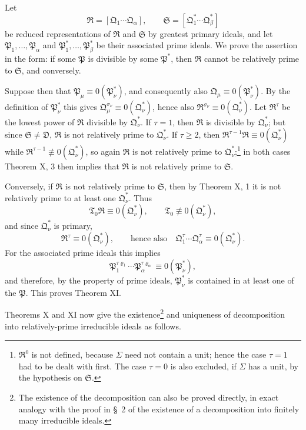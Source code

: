 \documentclass[11pt]{article}
\providecommand{\ideal}[1]{\mathfrak{#1}}
\begin{document}
Let
\[
 \ideal R=[\ideal Q_1\cdots\ideal Q_\alpha],
 \qquad
 \ideal S=[\ideal Q_1^*\cdots\ideal Q_\beta^*]
\]
be reduced representations of $\ideal R$ and $\ideal S$ by greatest primary ideals, and let $\ideal P_1,
\ldots,\ideal P_\alpha$ and $\ideal P_1^*,
\ldots,\ideal P_\beta^*$ be their associated prime ideals. We prove the assertion in the form: if some $\ideal P$ is divisible by some $\ideal P^*$, then $\ideal R$ cannot be relatively prime to $\ideal S$, and conversely.

Suppose then that $\ideal P_\mu\equiv0(\ideal P_\nu^*)$, and consequently also $\ideal Q_\mu\equiv0(\ideal P_\nu^*)$. By the definition of $\ideal P_\nu^*$ this gives $\ideal Q_\mu^{\sigma_\nu}\equiv0(\ideal Q_\nu^*)$, hence also $\ideal R^{\sigma_\nu}\equiv0(\ideal Q_\nu^*)$. Let $\ideal R^\tau$ be the lowest power of $\ideal R$ divisible by $\ideal Q_\nu^*$. If $\tau=1$, then $\ideal R$ is divisible by $\ideal Q_\nu^*$; but since $\ideal S\ne\ideal D$, $\ideal R$ is not relatively prime to $\ideal Q_\nu^*$. If $\tau\ge2$, then $\ideal R^{\tau-1}\ideal R\equiv0(\ideal Q_\nu^*)$ while $\ideal R^{\tau-1}\not\equiv0(\ideal Q_\nu^*)$, so again $\ideal R$ is not relatively prime to $\ideal Q_\nu^*$;\footnote{$\ideal R^0$ is not defined, because $\Sigma$ need not contain a unit; hence the case $\tau=1$ had to be dealt with first. The case $\tau=0$ is also excluded, if $\Sigma$ has a unit, by the hypothesis on $\ideal S$.} in both cases Theorem X, 3 then implies that $\ideal R$ is not relatively prime to $\ideal S$.

Conversely, if $\ideal R$ is not relatively prime to $\ideal S$, then by Theorem X, 1 it is not relatively prime to at least one $\ideal Q_\nu^*$. Thus
\[
 \ideal T_0\ideal R\equiv0(\ideal Q_\nu^*),
 \qquad
 \ideal T_0\not\equiv0(\ideal Q_\nu^*),
\]
and since $\ideal Q_\nu^*$ is primary,
\[
 \ideal R^\tau\equiv0(\ideal Q_\nu^*),\qquad
 \text{hence also}\quad
 \ideal Q_1^\tau\cdots\ideal Q_\alpha^\tau\equiv0(\ideal Q_\nu^*).
\]
For the associated prime ideals this implies
\[
 \ideal P_1^{\tau\varrho_1}\cdots\ideal P_\alpha^{\tau\varrho_\alpha}\equiv0(\ideal P_\nu^*),
\]
and therefore, by the property of prime ideals, $\ideal P_\nu^*$ is contained in at least one of the $\ideal P$. This proves Theorem XI.

Theorems X and XI now give the existence\footnote{The existence of the decomposition can also be proved directly, in exact analogy with the proof in \S~2 of the existence of a decomposition into finitely many irreducible ideals.} and uniqueness of decomposition into relatively-prime irreducible ideals as follows.
\end{document}
